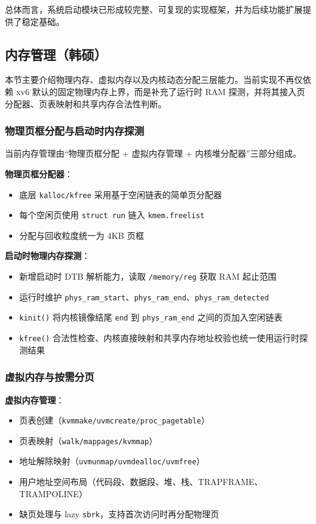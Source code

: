 \documentclass[12pt,a4paper]{ctexart}
\begin{document}
总体而言，系统启动模块已形成较完整、可复现的实现框架，并为后续功能扩展提供了稳定基础。

\subsection{内存管理（韩硕）}

本节主要介绍物理内存、虚拟内存以及内核动态分配三层能力。当前实现不再仅依赖 xv6 默认的固定物理内存上界，而是补充了运行时 RAM 探测，并将其接入页分配器、页表映射和共享内存合法性判断。

\subsubsection{物理页框分配与启动时内存探测}

当前内存管理由“物理页框分配 + 虚拟内存管理 + 内核堆分配器”三部分组成。

\textbf{物理页框分配器}：
\begin{itemize}
  \item 底层 \texttt{kalloc/kfree} 采用基于空闲链表的简单页分配器
  \item 每个空闲页使用 \texttt{struct run} 链入 \texttt{kmem.freelist}
  \item 分配与回收粒度统一为 4KB 页框
\end{itemize}

\textbf{启动时物理内存探测}：
\begin{itemize}
  \item 新增启动时 DTB 解析能力，读取 \texttt{/memory/reg} 获取 RAM 起止范围
  \item 运行时维护 \texttt{phys\_ram\_start}、\texttt{phys\_ram\_end}、\texttt{phys\_ram\_detected}
  \item \texttt{kinit()} 将内核镜像结尾 \texttt{end} 到 \texttt{phys\_ram\_end} 之间的页加入空闲链表
  \item \texttt{kfree()} 合法性检查、内核直接映射和共享内存地址校验也统一使用运行时探测结果
\end{itemize}

\subsubsection{虚拟内存与按需分页}

\textbf{虚拟内存管理}：
\begin{itemize}
  \item 页表创建（\texttt{kvmmake/uvmcreate/proc\_pagetable}）
  \item 页表映射（\texttt{walk/mappages/kvmmap}）
  \item 地址解除映射（\texttt{uvmunmap/uvmdealloc/uvmfree}）
  \item 用户地址空间布局（代码段、数据段、堆、栈、TRAPFRAME、TRAMPOLINE）
  \item 缺页处理与 lazy \texttt{sbrk}，支持首次访问时再分配物理页
\end{itemize}
\end{document}
